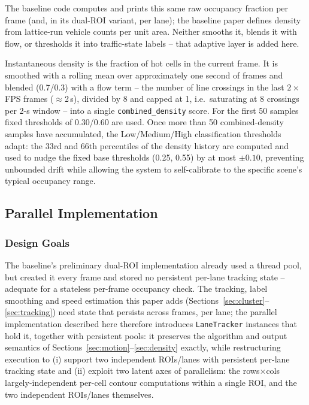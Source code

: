 \documentclass[conference]{IEEEtran}
\newcommand{\code}[1]{\texttt{#1}}
\begin{document}
The baseline code \cite{baseline} computes and prints this same raw
occupancy fraction per frame (and, in its dual-ROI variant, per lane);
the baseline paper defines density from lattice-run vehicle counts per
unit area. Neither smooths it, blends it with flow, or thresholds it
into traffic-state labels -- that adaptive layer is added here.

Instantaneous density is the fraction of hot cells in the current
frame. It is smoothed with a rolling mean over approximately one second
of frames and blended (0.7/0.3) with a flow term -- the number of line
crossings in the last $2\times$FPS frames ($\approx$2\,s), divided by 8
and capped at 1, i.e.\ saturating at 8 crossings per 2-s window -- into a
single \code{combined\_density} score. For the first 50 samples fixed
thresholds of 0.30/0.60 are used. Once more than 50 combined-density
samples have accumulated, the Low/Medium/High classification thresholds
adapt: the 33rd and 66th percentiles of the density history are computed
and used to nudge the fixed base thresholds (0.25, 0.55) by at most
$\pm0.10$, preventing unbounded drift while allowing the system to
self-calibrate to the specific scene's typical occupancy range.

\subsection{Parallel Implementation}
\label{sec:parallel}

\subsubsection{Design Goals}
The baseline's \cite{baseline} preliminary dual-ROI implementation
already used a thread pool, but created it every frame and stored no
persistent per-lane tracking state -- adequate for a stateless per-frame
occupancy check. The tracking, label smoothing and speed estimation this
paper adds (Sections~\ref{sec:cluster}--\ref{sec:tracking}) need state
that persists across frames, per lane; the parallel implementation
described here therefore introduces \code{LaneTracker} instances that
hold it, together with persistent pools: it preserves
the algorithm and output semantics of Sections~\ref{sec:motion}--\ref{sec:density}
exactly, while restructuring execution to (i) support two independent
ROIs/lanes with persistent per-lane tracking state and (ii) exploit two
latent axes of parallelism: the rows$\times$cols largely-independent
per-cell contour computations within a single ROI, and the two
independent ROIs/lanes themselves.
\end{document}
